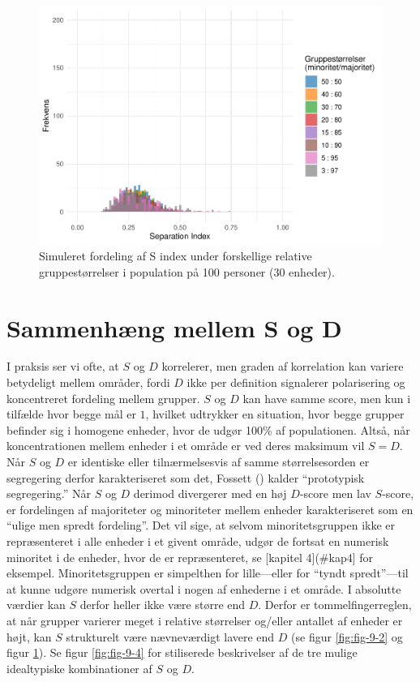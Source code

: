 \documentclass[
]{book}
\begin{document}
\begin{figure}
\includegraphics[width=1\linewidth]{en-befolkning-blander-sig_files/figure-latex/fig-9-3-1} \caption{Simuleret fordeling af S index under forskellige relative gruppestørrelser i population på 100 personer (30 enheder).}\label{fig:fig-9-3}
\end{figure}

\newpage

\section{Sammenhæng mellem S og D}\label{forskel}

I praksis ser vi ofte, at \(S\) og \(D\) korrelerer, men graden af korrelation kan variere betydeligt mellem områder, fordi \(D\) ikke per definition signalerer polarisering og koncentreret fordeling mellem grupper. \(S\) og \(D\) kan have samme score, men kun i tilfælde hvor begge mål er \(1\), hvilket udtrykker en situation, hvor begge grupper befinder sig i homogene enheder, hvor de udgør 100\% af populationen. Altså, når koncentrationen mellem enheder i et område er ved deres maksimum vil \(S=D\). Når \(S\) og \(D\) er identiske eller tilnærmelsesvis af samme størrelsesorden er segregering derfor karakteriseret som det, Fossett () kalder ``prototypisk segregering.'' Når \(S\) og \(D\) derimod divergerer med en høj \(D\)-score men lav \(S\)-score, er fordelingen af majoriteter og minoriteter mellem enheder karakteriseret som en ``ulige men spredt fordeling''. Det vil sige, at selvom minoritetsgruppen ikke er repræsenteret i alle enheder i et givent område, udgør de fortsat en numerisk minoritet i de enheder, hvor de er repræsenteret, se {[}kapitel 4{]}(\#kap4{]} for eksempel. Minoritetsgruppen er simpelthen for lille---eller for ``tyndt spredt''---til at kunne udgøre numerisk overtal i nogen af enhederne i et område. I absolutte værdier kan \(S\) derfor heller ikke være større end \(D\). Derfor er tommelfingerreglen, at når grupper varierer meget i relative størrelser og/eller antallet af enheder er højt, kan \(S\) strukturelt være nævneværdigt lavere end \(D\) (se figur \ref{fig:fig-9-2} og figur \ref{fig:fig-9-3}). Se figur \ref{fig:fig-9-4} for stiliserede beskrivelser af de tre mulige idealtypiske kombinationer af \(S\) og \(D\).
\end{document}
